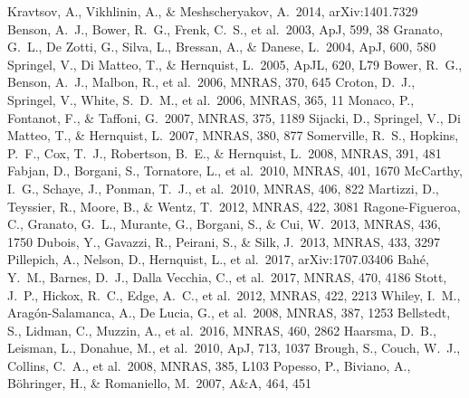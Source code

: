 \documentclass[
12pt, %
spanish,
singlespacing, %
headsepline, %
]{MastersDoctoralThesis} %
\def\apj {ApJ}
\def\apjl {ApJL}
\def\aap {A\&A}
\def\mnras {MNRAS}
\def\apj {ApJ}
\begin{document}
\begin{thebibliography}{X}
    Kravtsov, A., Vikhlinin, A., \& Meshscheryakov, A.\ 2014, arXiv:1401.7329
    Benson, A.~J., Bower, R.~G., Frenk, C.~S., et al.\ 2003, \apj, 599, 38 
    Granato, G.~L., De Zotti, G., Silva, L., Bressan, A., \& Danese, L.\ 2004, \apj, 600, 580 
    Springel, V., Di Matteo, T., \& Hernquist, L.\ 2005, \apjl, 620, L79 
    Bower, R.~G., Benson, A.~J., Malbon, R., et al.\ 2006, \mnras, 370, 645 
    Croton, D.~J., Springel, V., White, S.~D.~M., et al.\ 2006, \mnras, 365, 11 
    Monaco, P., Fontanot, F., \& Taffoni, G.\ 2007, \mnras, 375, 1189 
    Sijacki, D., Springel, V., Di Matteo, T., \& Hernquist, L.\ 2007, \mnras, 380, 877 
    Somerville, R.~S., Hopkins, P.~F., Cox, T.~J., Robertson, B.~E., \& Hernquist, L.\ 2008, \mnras, 391, 481 
    Fabjan, D., Borgani, S., Tornatore, L., et al.\ 2010, \mnras, 401, 1670 
    McCarthy, I.~G., Schaye, J., Ponman, T.~J., et al.\ 2010, \mnras, 406, 822 
    Martizzi, D., Teyssier, R., Moore, B., \& Wentz, T.\ 2012, \mnras, 422, 3081 
    Ragone-Figueroa, C., Granato, G.~L., Murante, G., Borgani, S., \& Cui, W.\ 2013, \mnras, 436, 1750 
    Dubois, Y., Gavazzi, R., Peirani, S., \& Silk, J.\ 2013, \mnras, 433, 3297 
    Pillepich, A., Nelson, D., Hernquist, L., et al.\ 2017, arXiv:1707.03406 
    Bah{\'e}, Y.~M., Barnes, D.~J., Dalla Vecchia, C., et al.\ 2017, \mnras, 470, 4186 
    Stott, J.~P., Hickox, R.~C., Edge, A.~C., et al.\ 2012, \mnras, 422, 2213 
    Whiley, I.~M., Arag{\'o}n-Salamanca, A., De Lucia, G., et al.\ 2008, \mnras, 387, 1253 
    Bellstedt, S., Lidman, C., Muzzin, A., et al.\ 2016, \mnras, 460, 2862 
    Haarsma, D.~B., Leisman, L., Donahue, M., et al.\ 2010, \apj, 713, 1037 
    Brough, S., Couch, W.~J., Collins, C.~A., et al.\ 2008, \mnras, 385, L103 
    Popesso, P., Biviano, A., B{\"o}hringer, H., \& Romaniello, M.\ 2007, \aap, 464, 451 

\end{thebibliography}
\end{document}
